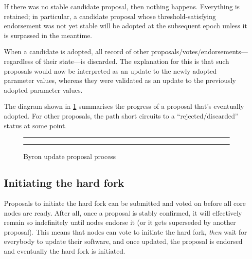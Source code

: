 \begin{enumerate}
If there was no stable candidate proposal, then nothing happens. Everything is
retained; in particular, a candidate proposal whose threshold-satisfying
endorsement was not yet stable will be adopted at the subsequent epoch unless it
is surpassed in the meantime.

When a candidate is adopted, all record of other
proposals/votes/endorsements---regardless of their state---is discarded. The
explanation for this is that such proposals would now be interpreted as an
update to the newly adopted parameter values, whereas they were validated as an
update to the previously adopted parameter values.

\end{enumerate}

The diagram shown in \cref{byron:update-process} summarises the progress of a
proposal that's eventually adopted. For other proposals, the path short circuits
to a ``rejected/discarded'' status at some point.

\begin{figure}
\hrule
\begin{center}
\end{center}
\hrule
\caption{\label{byron:update-process}Byron update proposal process}
\end{figure}

\subsection{Initiating the hard fork}
\label{byron:hardfork:initiating}

Proposals to initiate the hard fork can be submitted and voted on before all
core nodes are ready. After all, once a proposal is stably confirmed, it will
effectively remain so indefinitely until nodes endorse it (or it gets superseded
by another proposal). This means that nodes can vote to initiate the hard fork,
\emph{then} wait for everybody to update their software, and once updated, the
proposal is endorsed and eventually the hard fork is initiated.

